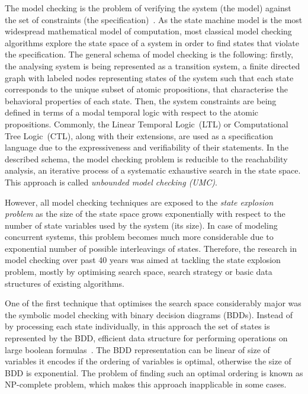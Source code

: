 The model checking is the problem of verifying the system (the model) against the set of constraints (the specification)~\cite{dkw2008}.
As the state machine model is the most widespread mathematical model of computation, most classical model checking algorithms explore the state space of a system in order to find states that violate the specification.
The general schema of model checking is the following: firstly, the analysing system is being represented as a transition system, a finite directed graph with labeled nodes representing states of the system such that each state corresponds to the unique subset of atomic propositions, that characterise the behavioral properties of each state.
Then, the system constraints are being defined in terms of a modal temporal logic with respect to the atomic propositions. Commonly, the Linear Temporal Logic~(LTL) or Computational Tree Logic~(CTL), along with their extensions, are used as a specification language due to the expressiveness and verifiability of their statements. 
In the described schema, the model checking problem is reducible to the reachability analysis, an iterative process of a systematic exhaustive search in the state space. This approach is called \textit{unbounded model checking (UMC)}.

However, all model checking techniques are exposed to the \textit{state explosion problem} as the size of the state space grows exponentially with respect to the number of state variables used by the system (its size). In case of modeling concurrent systems, this problem becomes much more considerable due to exponential number of possible interleavings of states.
Therefore, the research in model checking over past 40 years was aimed at tackling the state explosion problem, mostly by optimising search space, search strategy or basic data structures of existing algorithms.

One of the first technique that optimises the search space considerably major was the symbolic model checking with binary decision diagrams (BDDs). Instead of by processing each state individually, in this approach the set of states is represented by the BDD, efficient data structure for performing operations on large boolean formulas~\cite{clarke2012model}.
The BDD representation can be linear of size of variables it encodes if the ordering of variables is optimal, otherwise the size of BDD is exponential. The problem of finding such an optimal ordering is known as NP-complete problem, which makes this approach inapplicable in some cases.

